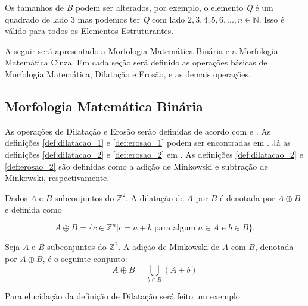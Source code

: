 Os tamanhos de $B$ podem ser alterados, por exemplo, o elemento \textit{Q} é um quadrado de lado $3$ mas podemos ter \textit{Q} com lado $2, 3, 4, 5, 6, ..., n \in \mathbb{N}$. Isso é válido para todos os Elementos Estruturantes.

A seguir será apresentado a Morfologia Matemática Binária e a Morfologia Matemática Cinza. Em cada seção será definido as operações básicas de Morfologia Matemática, Dilatação e Erosão, e as demais operações.

\subsection{Morfologia Matemática Binária}

As operações de Dilatação e Erosão serão definidas de acordo com \cite{pedrinischwartz} e \cite{haralick1987image}. As definições \ref{def:dilatacao_1} e \ref{def:erosao_1} podem ser encontradas em \cite{haralick1987image}. Já as definições \ref{def:dilatacao_2} e \ref{def:erosao_2} em \cite{pedrinischwartz}. As definições \ref{def:dilatacao_2} e \ref{def:erosao_2} são definidas como a adição de Minkowski e subtração de Minkowski, respectivamente.

\begin{define}
	Dados $A$ e $B$ subconjuntos do $\mathbb{Z}^2$. A dilatação de $A$ por $B$ é denotada por $A \oplus B$ e definida como
	
	\begin{equation}
		A \oplus B = \{c \in \mathbb{Z}^n | c = a + b \text{ para algum } a \in A \text{ e } b \in B\}.
	\end{equation}
	\label{def:dilatacao_1}
\end{define}

\begin{define}
	Seja $A$ e $B$ subconjuntos do $\mathbb{Z}^2$. A adição de Minkowski de $A$ com $B$, denotada por $A \oplus B$, é o seguinte conjunto:
	\begin{equation}
		A \oplus B = \bigcup_{b \in B} (A + b)
	\end{equation}
	\label{def:dilatacao_2}
\end{define}

Para elucidação da definição de Dilatação será feito um exemplo.

